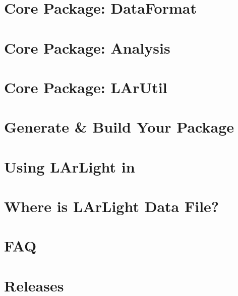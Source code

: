 \documentclass[a4paper,12pt]{report}
\begin{document}
\chapter{Core Package: DataFormat}
\label{chap:dataformat}


\chapter{Core Package: Analysis}
\label{chap:analysis}


\chapter{Core Package: LArUtil}
\label{chap:larutil}


\chapter{Generate \& Build Your Package}
\label{chap:generate}


\chapter{Using LArLight in \python}
\label{chap:pyroot}


\chapter{Where is LArLight Data File?}
\label{chap:datafile}


\chapter{FAQ}
\label{chap:faq}


\chapter{Releases}
\label{chap:releases}


%
%




\end{document}
